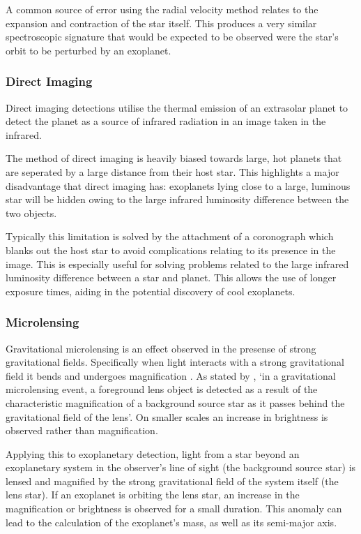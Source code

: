 \documentclass{report}
\begin{document}
A common source of error using the radial velocity method relates to the expansion and contraction of the star itself. This produces a very similar spectroscopic signature that would be expected to be observed were the star's orbit to be perturbed by an exoplanet.

\subsubsection{Direct Imaging }
Direct imaging detections utilise the thermal emission of an extrasolar planet to detect the planet as a source of infrared radiation in an image taken in the infrared. 

The method of direct imaging is heavily biased towards large, hot planets that are seperated by a large distance from their host star. This highlights a major disadvantage that direct imaging has: exoplanets lying close to a large, luminous star will be hidden owing to the large infrared luminosity difference between the two objects.   

Typically this limitation is solved by the attachment of a coronograph which blanks out the host star to avoid complications relating to its presence in the image. This is especially useful for solving problems related to the large infrared luminosity difference between a star and planet. This allows the use of longer exposure times, aiding in the potential discovery of cool exoplanets. 

\subsubsection{Microlensing }
Gravitational microlensing is an effect observed in the presense of strong gravitational fields. Specifically when light interacts with a strong gravitational field it bends and undergoes magnification \parencite{einstein}. As stated by \textcite{micro}, `in a gravitational microlensing event, a foreground lens object is detected as a result of the characteristic magnification of a background source star as it passes behind the gravitational field of the lens'. On smaller scales an increase in brightness is observed rather than magnification.

Applying this to exoplanetary detection, light from a star beyond an exoplanetary system in the observer's line of sight (the background source star) is lensed and magnified by the strong gravitational field of the system itself (the lens star). If an exoplanet is orbiting the lens star, an increase in the magnification or brightness is observed for a small duration. This anomaly can lead to the calculation of the exoplanet's mass, as well as its semi-major axis.
\end{document}
